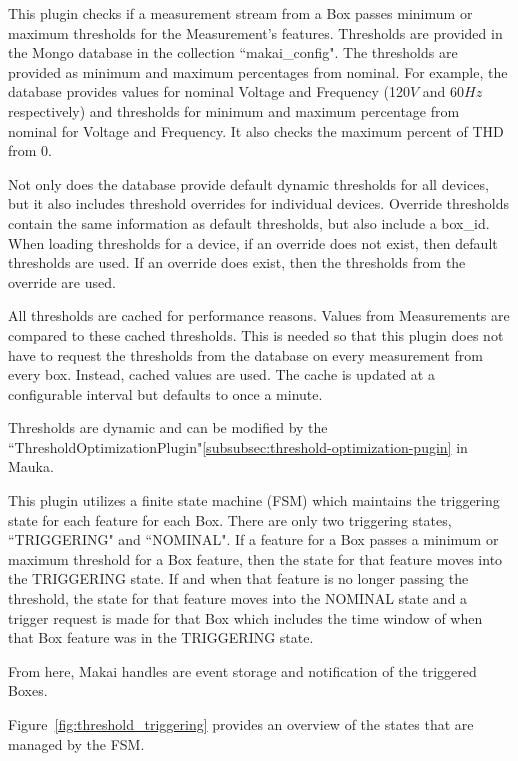This plugin checks if a measurement stream from a Box passes minimum or maximum thresholds for the Measurement's features. Thresholds are provided in the Mongo database in the collection ``makai\_config". The thresholds are provided as minimum and maximum percentages from nominal. For example, the database provides values for nominal Voltage and Frequency (120$V$ and 60$Hz$ respectively) and thresholds for minimum and maximum percentage from nominal for Voltage and Frequency. It also checks the maximum percent of THD from 0.

Not only does the database provide default dynamic thresholds for all devices, but it also includes threshold overrides for individual devices. Override thresholds contain the same information as default thresholds, but also include a box\_id. When loading thresholds for a device, if an override does not exist, then default thresholds are used. If an override does exist, then the thresholds from the override are used.

All thresholds are cached for performance reasons. Values from Measurements are compared to these cached thresholds. This is needed so that this plugin does not have to request the thresholds from the database on every measurement from every box. Instead, cached values are used. The cache is updated at a configurable interval but defaults to once a minute.

Thresholds are dynamic and can be modified by the ``ThresholdOptimizationPlugin"\ref{subsubsec:threshold-optimization-pugin} in Mauka.

This plugin utilizes a finite state machine (FSM) which maintains the triggering state for each feature for each Box. There are only two triggering states, ``TRIGGERING" and ``NOMINAL". If a feature for a Box passes a minimum or maximum threshold for a Box feature, then the state for that feature moves into the TRIGGERING state. If and when that feature is no longer passing the threshold, the state for that feature moves into the NOMINAL state and a trigger request is made for that Box which includes the time window of when that Box feature was in the TRIGGERING state.

From here, Makai handles are event storage and notification of the triggered Boxes.

Figure~\ref{fig:threshold_triggering} provides an overview of the states that are managed by the FSM\@.

